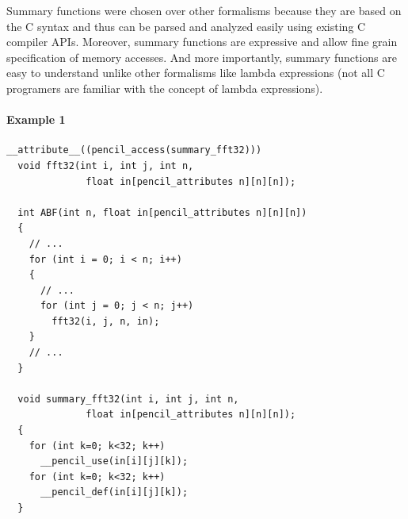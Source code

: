   Summary functions were chosen over other formalisms because they are based
  on the C syntax and thus can be parsed and analyzed easily using existing C
  compiler APIs.
  Moreover, summary functions are expressive and allow fine grain
  specification of memory accesses.
  And more importantly, summary functions are easy to understand unlike other
  formalisms like lambda expressions (not all C programers are familiar with
  the concept of lambda expressions).
  
% 
% 
% 
% 

  
\paragraph{Example 1}
  \begin{lstlisting}[language=pencil]
  __attribute__((pencil_access(summary_fft32)))
  void fft32(int i, int j, int n,
              float in[pencil_attributes n][n][n]);

  int ABF(int n, float in[pencil_attributes n][n][n])
  {
    // ...
    for (int i = 0; i < n; i++)
    {
      // ...
      for (int j = 0; j < n; j++)
        fft32(i, j, n, in);
    }
    // ...
  }

  void summary_fft32(int i, int j, int n,
              float in[pencil_attributes n][n][n]);
  {
    for (int k=0; k<32; k++)
      __pencil_use(in[i][j][k]);
    for (int k=0; k<32; k++)
      __pencil_def(in[i][j][k]);
  }
  \end{lstlisting}
  
